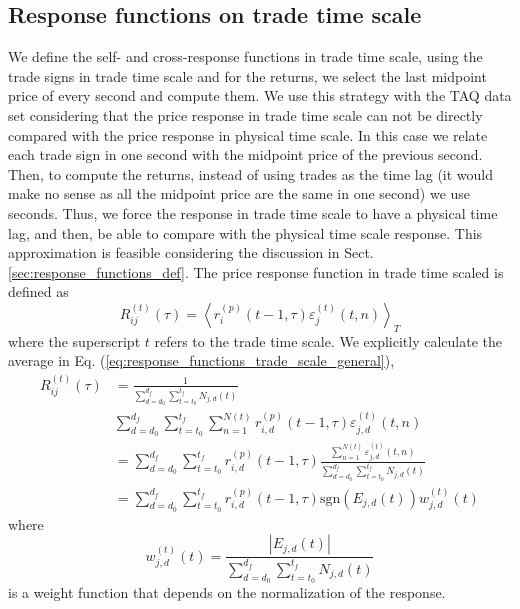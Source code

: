 \subsection{Response functions on trade time scale}
\label{subsec:response_function_trade}

We define the self- and cross-response functions in trade time scale, using the
trade signs in trade time scale and for the returns, we select the last
midpoint price of every second and compute them. We use this strategy with the
TAQ data set considering that the price response in trade time scale can not
be directly compared with the price response in physical time scale. In this
case we relate each trade sign in one second with the midpoint price of the
previous second. Then, to compute the returns, instead of using trades as the
time lag (it would make no sense as all the midpoint price are the same in one
second) we use seconds. Thus, we force the response in trade time scale to have
a physical time lag, and then, be able to compare with the physical time scale
response. This approximation is feasible considering the discussion in Sect.
\ref{sec:response_functions_def}. The price response function in trade time
scaled is defined as
\begin{equation}\label{eq:response_functions_trade_scale_general}
    R^{\left(t\right)}_{ij}\left(\tau\right)=\left\langle r^{\left(p\right)}
    _{i}\left(t-1,\tau \right)\varepsilon_{j}^{\left(t\right)}
    \left(t, n\right)\right\rangle _{T}
\end{equation}
where the superscript $t$ refers to the trade time scale. We explicitly
calculate the average in Eq. (\ref{eq:response_functions_trade_scale_general}),
\begin{align}\label{eq:response_trades_explicit}
    R_{ij}^{\left(t\right)}\left(\tau\right)&=\frac{1}{\sum_{d=d_{0}}^{d_{f}}
    \sum_{t=t_{0}}^{t_{f}}N_{j,d} \left(t \right)} \nonumber \\
    &\sum_{d=d_{0}}^{d_{f}}\sum_{t=t_{0}}^{t_{f}}\sum_{n=1}
    ^{N\left(t\right)} r^{\left(p\right)}_{i,d}\left(t-1, \tau\right)
    \varepsilon_{j,d}^{\left(t\right)}\left(t,n\right)\\
    &=\sum_{d=d_{0}}^{d_{f}}\sum_{t=t_{0}}^{t_{f}} r^{\left(p\right)}_{i,d}
    \left(t-1,\tau\right) \frac{\sum_{n=1}^{N\left(t\right)}
    \varepsilon_{j,d}^{\left(t\right)}\left(t,n \right)}
    {\sum_{d=d_{0}}^{d_{f}} \sum_{t=t_{0}}^{t_{f}}N_{j,d}\left(t\right)}
    \nonumber \\
    &=\sum_{d=d_{0}}^{d_{f}}\sum_{t=t_{0}}^{t_{f}}r^{\left(p\right)}_{i,d}
    \left(t-1,\tau\right) \text{sgn}\left(E_{j,d}\left(t\right)\right)
    w_{j,d}^{\left(t\right)}\left(t\right)
\end{align}
where
\begin{equation}\label{eq:trade_weight}
    w_{j,d}^{\left(t\right)}\left(t\right) =
    \frac{\left|E_{j,d}\left(t\right)\right|}{\sum_{d=d_{0}}^{d_{f}}
    \sum_{t=t_{0}}^{t_{f}}N_{j,d} \left(t\right)}
\end{equation}
is a weight function that depends on the normalization of the response.

